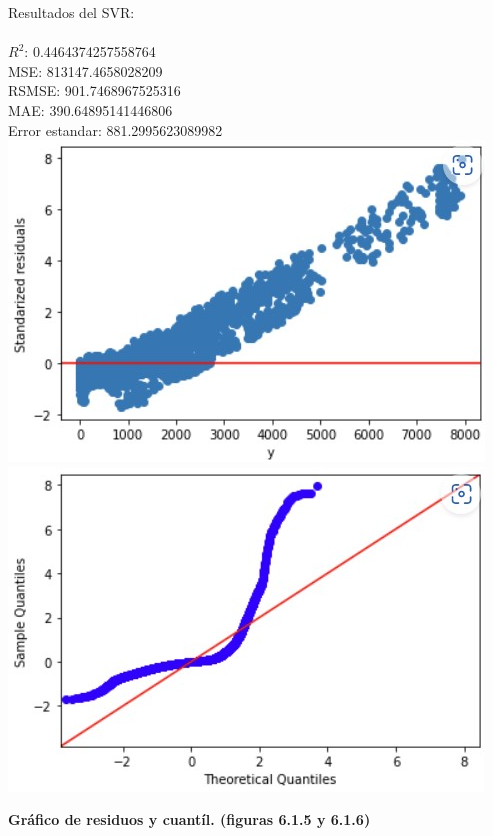 \documentclass{article}
\begin{document}
                
            Resultados del SVR:\\
                    \\
                        $R^2$:  0.4464374257558764 \\
                        MSE:  813147.4658028209 \\
                        RSMSE:  901.7468967525316 \\
                        MAE:  390.64895141446806 \\
                        Error estandar:  881.2995623089982 \\
                
                        \includegraphics[scale=0.6]{images/SVR_After_SS.jpg} 
                        \includegraphics[scale=0.6]{images/SVR_After_SS_Q.jpg}
                        \begin{center}
                            \textbf{Gráfico de residuos y cuantíl. (figuras 6.1.5 y 6.1.6)}
                        \end{center}
\end{document}
